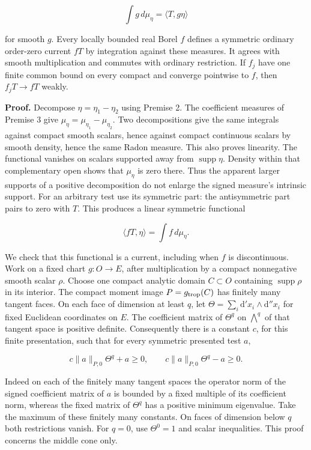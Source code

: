 \documentclass[
  11pt,
]{article}
\begin{document}
\[ \int g\,d\mu_\eta=\langle T,g\eta\rangle \]

for smooth \(g\). Every locally bounded real Borel \(f\) defines a
symmetric ordinary order-zero current \(fT\) by integration against
these measures. It agrees with smooth multiplication and commutes with
ordinary restriction. If \(f_j\) have one finite common bound on every
compact and converge pointwise to \(f\), then \(f_jT\to fT\) weakly.

\textbf{Proof.} Decompose \(\eta=\eta_1-\eta_2\) using Premise 2. The
coefficient measures of Premise 3 give
\(\mu_\eta=\mu_{\eta_1}-\mu_{\eta_2}\). Two decompositions give the same
integrals against compact smooth scalars, hence against compact
continuous scalars by smooth density, hence the same Radon measure. This
also proves linearity. The functional vanishes on scalars supported away
from \(\operatorname{supp}\eta\). Density within that complementary open
shows that \(\mu_\eta\) is zero there. Thus the apparent larger supports
of a positive decomposition do not enlarge the signed measure's
intrinsic support. For an arbitrary test use its symmetric part: the
antisymmetric part pairs to zero with \(T\). This produces a linear
symmetric functional

\[\langle fT,\eta\rangle=\int f\,d\mu_\eta. \tag{2}\]

We check that this functional is a current, including when \(f\) is
discontinuous. Work on a fixed chart \(g:O\to E\), after multiplication
by a compact nonnegative smooth scalar \(\rho\). Choose one compact
analytic domain \(C\subset O\) containing \(\operatorname{supp}\rho\) in
its interior. The compact moment image \(P=g_{\rm trop}(C)\) has
finitely many tangent faces. On each face of dimension at least \(q\),
let \(\Theta=\sum_i\mathrm d'x_i\wedge\mathrm d''x_i\) for fixed
Euclidean coordinates on \(E\). The coefficient matrix of \(\Theta^q\)
on \(\bigwedge^q\) of that tangent space is positive definite.
Consequently there is a constant \(c\), for this finite presentation,
such that for every symmetric presented test \(a\),

\[ c\|a\|_{P,0}\Theta^q+a\geq0,\qquad
   c\|a\|_{P,0}\Theta^q-a\geq0. \tag{3}\]

Indeed on each of the finitely many tangent spaces the operator norm of
the signed coefficient matrix of \(a\) is bounded by a fixed multiple of
its coefficient norm, whereas the fixed matrix of \(\Theta^q\) has a
positive minimum eigenvalue. Take the maximum of these finitely many
constants. On faces of dimension below \(q\) both restrictions vanish.
For \(q=0\), use \(\Theta^0=1\) and scalar inequalities. This proof
concerns the middle cone only.
\end{document}
